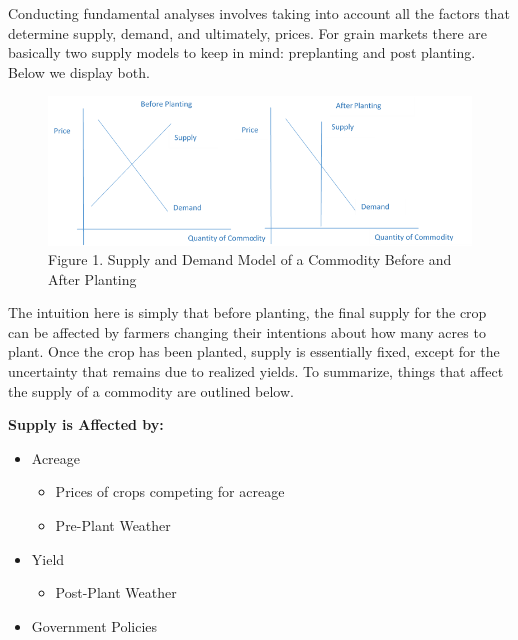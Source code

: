 \documentclass[
  letterpaper,
  DIV=11,
  numbers=noendperiod]{scrreprt}
\providecommand{\tightlist}{%
  \setlength{\itemsep}{0pt}\setlength{\parskip}{0pt}}\usepackage{longtable,booktabs,array}
\begin{document}
Conducting fundamental analyses involves taking into account all the
factors that determine supply, demand, and ultimately, prices. For grain
markets there are basically two supply models to keep in mind:
preplanting and post planting. Below we display both.

\begin{figure}

{\centering \includegraphics{images/Ch3.1.png}

}

\caption{Figure 1. Supply and Demand Model of a Commodity Before and
After Planting}

\end{figure}

The intuition here is simply that before planting, the final supply for
the crop can be affected by farmers changing their intentions about how
many acres to plant. Once the crop has been planted, supply is
essentially fixed, except for the uncertainty that remains due to
realized yields. To summarize, things that affect the supply of a
commodity are outlined below.

\textbf{Supply is Affected by:}

\begin{itemize}
\item
  Acreage

  \begin{itemize}
  \tightlist
  \item
    Prices of crops competing for acreage
  \item
    Pre-Plant Weather
  \end{itemize}
\item
  Yield

  \begin{itemize}
  \tightlist
  \item
    Post-Plant Weather
  \end{itemize}
\item
  Government Policies
\end{itemize}
\end{document}
